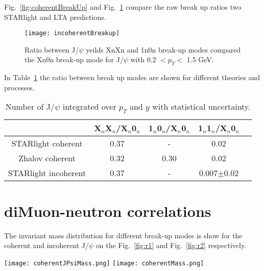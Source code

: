    Fig.~\ref{fig:coherentBreakUp} and Fig.~\ref{fig:incoherentBreakUp} compare
      the raw break up ratios two STARlight and LTA predictions. 

    \begin{figure}[!Hhtb]
      \centering
      \texttt{[image: incoherentBreakup]}
      \caption{Ratio between J/$\psi$ yeilds XnXn and 1n0n break-up modes 
        compared the Xn0n break-up mode for J/$\psi$ with 0.2 $< p_{T} <$ 
        1.5 GeV.}
      \label{fig:incoherentBreakUp}
    \end{figure}

    In Table~\ref{tab:r3} the ratio between break up modes are shown for 
      different theories and processes.

    \begin{table}[h]
      \begin{center}
        \caption{Number of  J/$\psi$ integrated over $p_{T}$ and $y$ with statistical uncertainty.}
        \label{tab:r3}
        \begin{tabular}{|c|c|c|c|c|}
          \hline
          & X$_{n}$X$_{n}$/X$_{n}$0$_{n}$ & 1$_{n}$0$_{n}$/X$_{n}$0$_{n}$ & 1$_{n}$1$_{n}$/X$_{n}$0$_{n}$  \\ 
          \hline
          STARlight coherent &  0.37&-&0.02\\
          \hline
          Zhalov coherent& 0.32&0.30&0.02\\
          \hline
          STARlight incoherent &  0.37&-&0.007$\pm$0.02 \\
          \hline
        \end{tabular}
      \end{center}
    \end{table}

  \section{diMuon-neutron correlations}
    The invariant mass distribution for different break-up modes is show for the coherent and incoherent J/$\psi$ on the Fig.~\ref{fig:r1} and Fig.~\ref{fig:r2} respectively. 
    \begin{figure*}[!Hhtb]
      \begin{center}
        \texttt{[image: coherentJPsiMass.png]}
        \texttt{[image: coherentMass.png]}
        \caption{
          \label{fig:r1}  
          Invariant mass spectrum of the opposite signs di-muons originating from the coherent J/$\psi$ for $X_{n}0_{n}$ breakup mode for two invariant mass regions.  
        }
      \end{center}
    \end{figure*}
    
